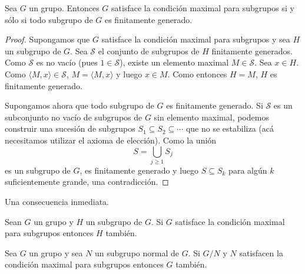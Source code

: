 
\begin{proposition}
	\label{pro:MAX=fg}
	Sea $G$ un grupo. Entonces $G$ satisface la condición maximal para
	subgrupos si y sólo si todo subgrupo de $G$ es finitamente generado.
\end{proposition}

\begin{proof}
	Supongamos que $G$ satisface la condición maximal para subgrupos y sea $H$
	un subgrupo de $G$.  Sea $\mathcal{S}$ el conjunto de subgrupos de $H$
	finitamente generados. Como $\mathcal{S}$ es no vacío (pues
	$1\in\mathcal{S}$), existe un elemento maximal $M\in\mathcal{S}$.  Sea
	$x\in H$. Como $\langle M,x\rangle\in\mathcal{S}$, $M=\langle M,x\rangle$ y
	luego $x\in M$. Como entonces $H=M$, $H$ es finitamente generado.

	Supongamos ahora que todo subgrupo de $G$ es finitamente generado. Si
	$\mathcal{S}$ es un subconjunto no vacío de subgrupos de $G$ sin elemento
	maximal, podemos construir una sucesión de subgrupos $S_1\subseteq
	S_2\subseteq\cdots$ que no se estabiliza (acá necesitamos utilizar el
	axioma de elección). Como la unión 
	\[
		S=\bigcup_{j\geq1}S_j 
	\]
	es un subgrupo de $G$, es finitamente generado y luego $S\subseteq S_k$
	para algún $k$ suficientemente grande, una contradicción.
\end{proof}

Una consecuencia inmediata. 

\begin{proposition}
    Sean $G$ un grupo y $H$ un subgrupo de $G$.  Si $G$ satisface la
	condición maximal para subgrupos entonces $H$ también. 
\end{proposition}

\begin{proposition}
	\label{proposition:max:G/N}
	Sea $G$ un grupo y sea $N$ un subgrupo normal de $G$.  Si $G/N$ y $N$
	satisfacen la condición maximal para subgrupos entonces $G$ también. 
\end{proposition}

